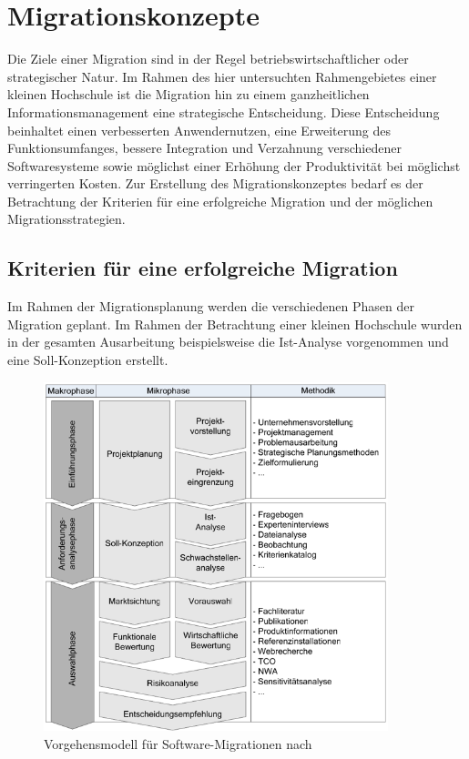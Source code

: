 \section{Migrationskonzepte}
\label{section_migrationskonzepte}
Die Ziele einer Migration sind in der Regel betriebswirtschaftlicher oder strategischer Natur. Im Rahmen des hier untersuchten Rahmengebietes einer kleinen Hochschule ist die Migration hin zu einem ganzheitlichen Informationsmanagement eine strategische Entscheidung. Diese Entscheidung beinhaltet einen verbesserten Anwendernutzen, eine Erweiterung des Funktionsumfanges, bessere Integration und Verzahnung verschiedener Softwaresysteme sowie möglichst einer Erhöhung der Produktivität bei möglichst verringerten Kosten. Zur Erstellung des Migrationskonzeptes bedarf es der Betrachtung der Kriterien für eine erfolgreiche Migration und der möglichen Migrationsstrategien.

\subsection{Kriterien für eine erfolgreiche Migration}
Im Rahmen der Migrationsplanung werden die verschiedenen Phasen der Migration geplant. Im Rahmen der Betrachtung einer kleinen Hochschule wurden in der gesamten Ausarbeitung beispielsweise die Ist-Analyse vorgenommen und eine Soll-Konzeption erstellt.

\begin{figure}[h!]
	\centering
	\includegraphics[width=10cm]{kapitel/gruppe4_1/bilder/vorgehensmodell_softwaremigration}
	\caption{Vorgehensmodell für Software-Migrationen nach \cite{migrationsleitfaden_2012}}
	\label{fig_vorgehensmodell_softwaremigration}	
\end{figure}

